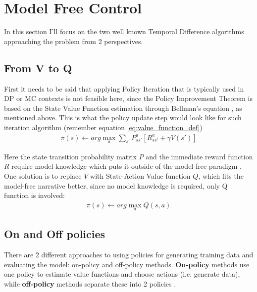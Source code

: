 
\section{Model Free Control }
In this section I'll focus on the two well known 
Temporal Difference algorithms approaching the problem
from 2 perspectives. 


\subsection{From V to Q} 
First it needs to be said that applying Policy Iteration that is typically used in DP or MC contexts is not feasible here, since the Policy Improvement Theorem is based on the State Value Function estimation through Bellman's equation \cite{lecture_mfc}, as mentioned above. This is what the policy update step would look like for such iteration algorithm (remember equation \ref{eq:value_function_def})
\begin{align}
    \pi(s) \leftarrow arg \max_{a} \sum_{s'} P^{a}_{ss'} [R^{a}_{ss'} + \gamma V(s')]
\end{align}

Here the state transition probability matrix $P$ and 
the immediate reward function $R$ require model-knowledge
which puts it outside of the model-free paradigm \cite{lecture_mfc}. One solution is to replace $V$ with 
State-Action Value function $Q$, which fits the 
model-free narrative better, since no model knowledge
is required, only Q function is involved:  
\begin{align}
    \pi(s) \leftarrow arg \max_{a} Q(s, a) 
\end{align}

\subsection{On and Off policies}
There are 2 different approaches to using policies for 
generating training data and evaluating the model: on-policy and
off-policy methods.
\textbf{On-policy} methods use one policy to estimate value functions and choose actions (i.e. generate data), while \textbf{off-policy} methods separate these into 2 policies \cite{lecture_mfc}. 

